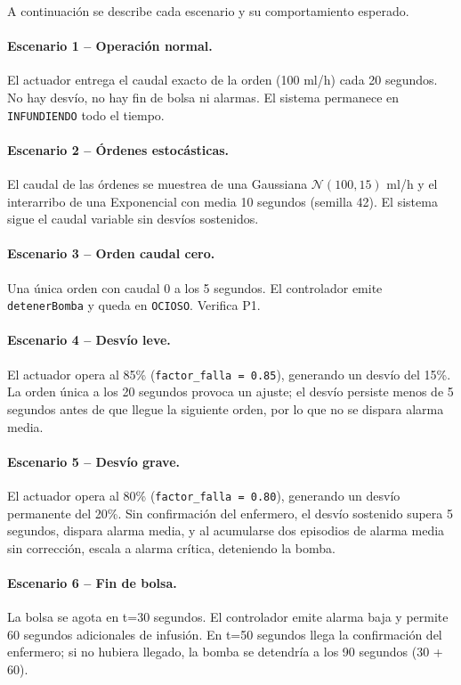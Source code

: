 \documentclass[12pt,a4paper]{article}
\begin{document}
A continuación se describe cada escenario y su comportamiento esperado.

\paragraph{Escenario 1 -- Operación normal.} El actuador entrega el
caudal exacto de la orden (100 ml/h) cada 20 segundos.  No hay desvío,
no hay fin de bolsa ni alarmas.  El sistema permanece en
\texttt{INFUNDIENDO} todo el tiempo.

\paragraph{Escenario 2 -- Órdenes estocásticas.} El caudal de las
órdenes se muestrea de una Gaussiana $\mathcal{N}(100, 15)$ ml/h y el
interarribo de una Exponencial con media 10 segundos (semilla 42).
El sistema sigue el caudal variable sin desvíos sostenidos.

\paragraph{Escenario 3 -- Orden caudal cero.} Una única orden con
caudal 0 a los 5 segundos.  El controlador emite
\texttt{detenerBomba} y queda en \texttt{OCIOSO}.  Verifica P1.

\paragraph{Escenario 4 -- Desvío leve.} El actuador opera al 85\%
(\texttt{factor\_falla = 0.85}), generando un desvío del 15\%.  La
orden única a los 20 segundos provoca un ajuste; el desvío persiste
menos de 5 segundos antes de que llegue la siguiente orden, por lo
que no se dispara alarma media.

\paragraph{Escenario 5 -- Desvío grave.} El actuador opera al 80\%
(\texttt{factor\_falla = 0.80}), generando un desvío permanente del
20\%.  Sin confirmación del enfermero, el desvío sostenido supera
5 segundos, dispara alarma media, y al acumularse dos episodios de
alarma media sin corrección, escala a alarma crítica, deteniendo la
bomba.

\paragraph{Escenario 6 -- Fin de bolsa.} La bolsa se agota en
t=30 segundos.  El controlador emite alarma baja y permite 60
segundos adicionales de infusión.  En t=50 segundos llega la
confirmación del enfermero; si no hubiera llegado, la bomba se
detendría a los 90 segundos (30 + 60).
\end{document}
